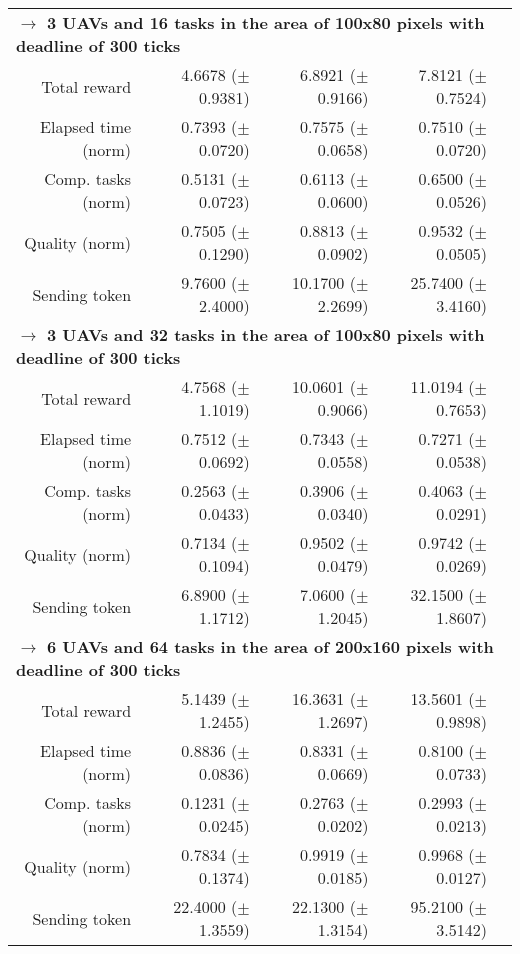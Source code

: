 \begin{table}
\begin{tabular}{rrrrr}
	    \multicolumn{5}{l}{\textbf{$\longrightarrow$ 3 UAVs and 16 tasks in the area of 100x80 pixels with deadline of 300 ticks}} \\
	Total reward           & 4.6678   ($\pm$0.9381)  &  6.8921  ($\pm$0.9166) & 7.8121  ($\pm$0.7524)   \\
	Elapsed time (norm)    & 0.7393   ($\pm$0.0720)  &  0.7575  ($\pm$0.0658) & 0.7510  ($\pm$0.0720)    \\ 
	Comp. tasks (norm)     & 0.5131   ($\pm$0.0723)  &  0.6113  ($\pm$0.0600) & 0.6500  ($\pm$0.0526)    \\ 
	Quality (norm)         & 0.7505  ($\pm$0.1290)   &  0.8813  ($\pm$0.0902) & 0.9532  ($\pm$0.0505)  \\ 
	Sending token          & 9.7600  ($\pm$2.4000)   & 10.1700  ($\pm$2.2699) & 25.7400 ($\pm$3.4160)  \\ [1ex]
	
	    \multicolumn{5}{l}{\textbf{$\longrightarrow$  3 UAVs and 32 tasks in the area of 100x80 pixels with deadline of 300 ticks}} \\
	Total reward           & 4.7568   ($\pm$1.1019)  & 10.0601  ($\pm$0.9066) & 11.0194 ($\pm$0.7653)   \\
	Elapsed time (norm)    & 0.7512   ($\pm$0.0692)  &  0.7343  ($\pm$0.0558) & 0.7271  ($\pm$0.0538)    \\ 
	Comp. tasks (norm)     & 0.2563   ($\pm$0.0433)  &  0.3906  ($\pm$0.0340) & 0.4063  ($\pm$0.0291)    \\ 
	Quality (norm)         & 0.7134  ($\pm$0.1094)   &  0.9502  ($\pm$0.0479) & 0.9742  ($\pm$0.0269)  \\ 
	Sending token          & 6.8900  ($\pm$1.1712)   &  7.0600  ($\pm$1.2045) & 32.1500 ($\pm$1.8607)  \\ [1ex]
	
	    \multicolumn{5}{l}{\textbf{$\longrightarrow$ 6 UAVs and 64 tasks in the area of 200x160 pixels with deadline of 300 ticks}} \\
	Total reward           & 5.1439   ($\pm$1.2455)  & 16.3631  ($\pm$1.2697) & 13.5601 ($\pm$0.9898)   \\
	Elapsed time (norm)    & 0.8836   ($\pm$0.0836)  &  0.8331  ($\pm$0.0669) & 0.8100  ($\pm$0.0733)    \\ 
	Comp. tasks (norm)     & 0.1231   ($\pm$0.0245)  &  0.2763  ($\pm$0.0202) & 0.2993  ($\pm$0.0213)    \\ 
	Quality (norm)         & 0.7834  ($\pm$0.1374)   &  0.9919  ($\pm$0.0185) & 0.9968  ($\pm$0.0127)  \\ 
	Sending token          & 22.4000 ($\pm$1.3559)   & 22.1300  ($\pm$1.3154) & 95.2100 ($\pm$3.5142)  \\ [1ex]


\end{tabular}
\end{table}
